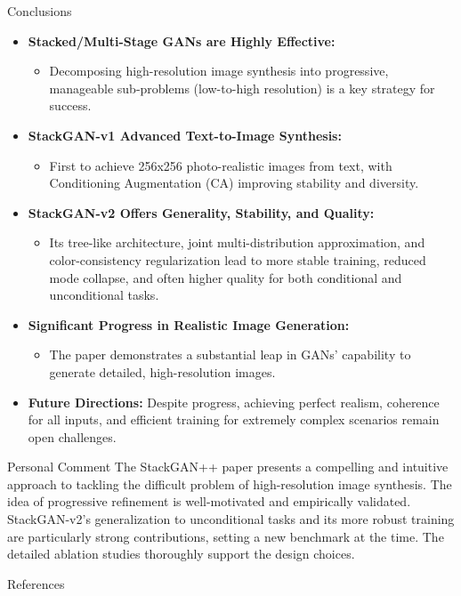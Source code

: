 \documentclass{beamer}
\begin{document}
\begin{frame}{Conclusions}
    \begin{itemize}
        \item \textbf{Stacked/Multi-Stage GANs are Highly Effective:}
            \begin{itemize}
                \item Decomposing high-resolution image synthesis into progressive, manageable sub-problems (low-to-high resolution) is a key strategy for success.
            \end{itemize}
        \item \textbf{StackGAN-v1 Advanced Text-to-Image Synthesis:}
            \begin{itemize}
                \item First to achieve 256x256 photo-realistic images from text, with Conditioning Augmentation (CA) improving stability and diversity.
            \end{itemize}
        \item \textbf{StackGAN-v2 Offers Generality, Stability, and Quality:}
            \begin{itemize}
                \item Its tree-like architecture, joint multi-distribution approximation, and color-consistency regularization lead to more stable training, reduced mode collapse, and often higher quality for both conditional and unconditional tasks.
            \end{itemize}
        \item \textbf{Significant Progress in Realistic Image Generation:}
            \begin{itemize}
                \item The paper demonstrates a substantial leap in GANs' capability to generate detailed, high-resolution images.
            \end{itemize}
        \item \textbf{Future Directions:} Despite progress, achieving perfect realism, coherence for all inputs, and efficient training for extremely complex scenarios remain open challenges.
    \end{itemize}
    \vspace{0.3cm}
    \begin{block}{Personal Comment}
        The StackGAN++ paper presents a compelling and intuitive approach to tackling the difficult problem of high-resolution image synthesis. The idea of progressive refinement is well-motivated and empirically validated. StackGAN-v2's generalization to unconditional tasks and its more robust training are particularly strong contributions, setting a new benchmark at the time. The detailed ablation studies thoroughly support the design choices.
    \end{block}
\end{frame}

\begin{frame}[allowframebreaks]{References}
    \nocite{*} %
     
    
\end{frame}
\end{document}
